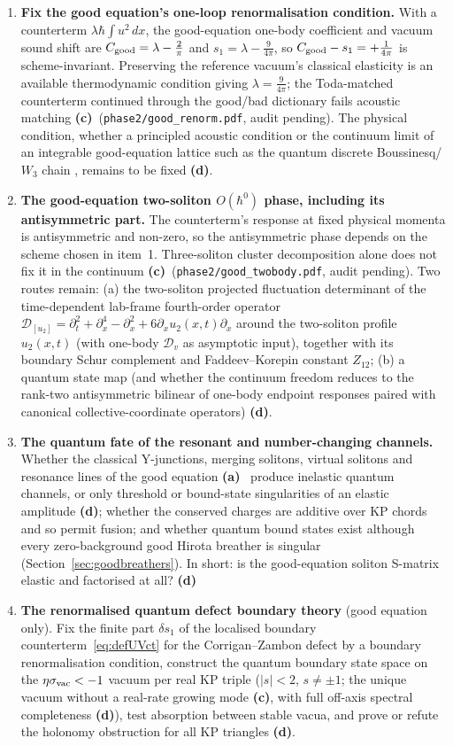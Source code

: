 \documentclass[11pt,a4paper]{article}
\newcommand{\lab}[1]{{\normalfont\sffamily\footnotesize\bfseries(#1)}}
\newcommand{\La}{\lab{a}}
\newcommand{\Lc}{\lab{c}}
\newcommand{\Ld}{\lab{d}}
\newcommand{\hb}{\hbar}
\theoremstyle{remark}
\begin{document}
\begin{enumerate}
\item \textbf{Fix the good equation's one-loop renormalisation condition.} With a counterterm $\lambda\hb\int u^2\,dx$, the good-equation one-body coefficient and vacuum sound shift are $C_{\rm good}=\lambda-\frac2\pi$ and $s_1=\lambda-\frac{9}{4\pi}$, so $C_{\rm good}-s_1=+\frac1{4\pi}$ is scheme-invariant. Preserving the reference vacuum's classical elasticity is an available thermodynamic condition giving $\lambda=\frac9{4\pi}$; the Toda-matched counterterm continued through the good/bad dictionary fails acoustic matching \Lc\ (\texttt{phase2/good\_renorm.pdf}, audit pending). The physical condition, whether a principled acoustic condition or the continuum limit of an integrable good-equation lattice such as the quantum discrete Boussinesq/$W_3$ chain \cite{Hikami}, remains to be fixed \Ld.
\item \textbf{The good-equation two-soliton $O(\hb^0)$ phase, including its antisymmetric part.} The counterterm's response at fixed physical momenta is antisymmetric and non-zero, so the antisymmetric phase depends on the scheme chosen in item~1. Three-soliton cluster decomposition alone does not fix it in the continuum \Lc\ (\texttt{phase2/good\_twobody.pdf}, audit pending). Two routes remain: (a) the two-soliton projected fluctuation determinant of the time-dependent lab-frame fourth-order operator $\mathcal D_{[u_2]}=\partial_t^2+\partial_x^4-\partial_x^2+6\partial_xu_2(x,t)\partial_x$ around the two-soliton profile $u_2(x,t)$ (with one-body $\mathcal D_v$ as asymptotic input), together with its boundary Schur complement and Faddeev--Korepin constant $Z_{12}$; (b) a quantum state map (and whether the continuum freedom reduces to the rank-two antisymmetric bilinear of one-body endpoint responses paired with canonical collective-coordinate operators) \Ld.
\item \textbf{The quantum fate of the resonant and number-changing channels.} Whether the classical Y-junctions, merging solitons, virtual solitons and resonance lines of the good equation \La~\cite{HI,LMK,RS,DMHC,CZ} produce inelastic quantum channels, or only threshold or bound-state singularities of an elastic amplitude \Ld; whether the conserved charges are additive over KP chords and so permit fusion; and whether quantum bound states exist although every zero-background good Hirota breather is singular (Section~\ref{sec:goodbreathers}). In short: is the good-equation soliton S-matrix elastic and factorised at all? \Ld
\item \textbf{The renormalised quantum defect boundary theory} (good equation only). Fix the finite part $\delta s_1$ of the localised boundary counterterm~\eqref{eq:defUVct} for the Corrigan--Zambon defect by a boundary renormalisation condition, construct the quantum boundary state space on the $\eta\sigma_{\rm vac}<-1$ vacuum per real KP triple ($|s|<2$, $s\neq\pm1$; the unique vacuum without a real-rate growing mode \Lc, with full off-axis spectral completeness \Ld), test absorption between stable vacua, and prove or refute the holonomy obstruction for all KP triangles \Ld.

\end{enumerate}
\end{document}
